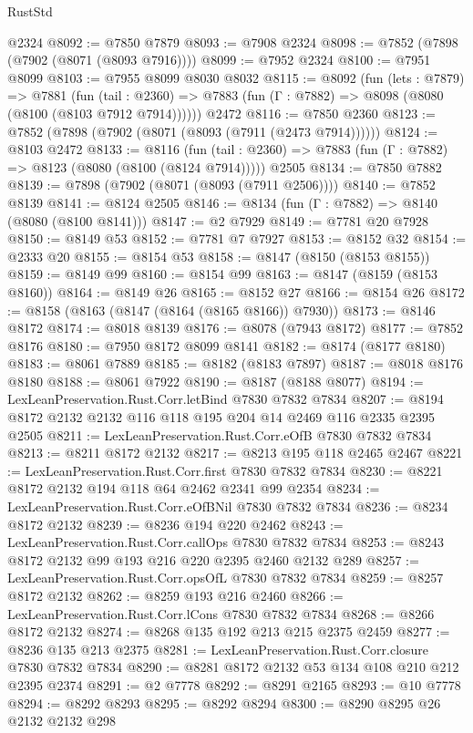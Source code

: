 \begin{lexlean}{RustStd}
\begin{coremodule}
    @2324
@8092 := @7850 @7879
@8093 := @7908 @2324
@8098 := @7852 (@7898 (@7902 (@8071 (@8093 @7916))))
@8099 := @7952 @2324
@8100 := @7951 @8099
@8103 := @7955 @8099 @8030 @8032
@8115 := @8092
    (fun (lets : @7879) =>
    @7881
      (fun (tail : @2360) => @7883 (fun (Γ : @7882) => @8098 (@8080 (@8100 (@8103 @7912 @7914))))))
    @2472
@8116 := @7850 @2360
@8123 := @7852 (@7898 (@7902 (@8071 (@8093 (@7911 (@2473 @7914))))))
@8124 := @8103 @2472
@8133 := @8116
    (fun (tail : @2360) => @7883 (fun (Γ : @7882) => @8123 (@8080 (@8100 (@8124 @7914)))))
    @2505
@8134 := @7850 @7882
@8139 := @7898 (@7902 (@8071 (@8093 (@7911 @2506))))
@8140 := @7852 @8139
@8141 := @8124 @2505
@8146 := @8134 (fun (Γ : @7882) => @8140 (@8080 (@8100 @8141)))
@8147 := @2 @7929
@8149 := @7781 @20 @7928
@8150 := @8149 @53
@8152 := @7781 @7 @7927
@8153 := @8152 @32
@8154 := @2333 @20
@8155 := @8154 @53
@8158 := @8147 (@8150 (@8153 @8155))
@8159 := @8149 @99
@8160 := @8154 @99
@8163 := @8147 (@8159 (@8153 @8160))
@8164 := @8149 @26
@8165 := @8152 @27
@8166 := @8154 @26
@8172 := @8158 (@8163 (@8147 (@8164 (@8165 @8166)) @7930))
@8173 := @8146 @8172
@8174 := @8018 @8139
@8176 := @8078 (@7943 @8172)
@8177 := @7852 @8176
@8180 := @7950 @8172 @8099 @8141
@8182 := @8174 (@8177 @8180)
@8183 := @8061 @7889
@8185 := @8182 (@8183 @7897)
@8187 := @8018 @8176 @8180
@8188 := @8061 @7922
@8190 := @8187 (@8188 @8077)
@8194 := LexLeanPreservation.Rust.Corr.letBind @7830 @7832 @7834
@8207 := @8194 @8172 @2132 @2132 @116 @118 @195 @204 @14 @2469 @116 @2335 @2395 @2505
@8211 := LexLeanPreservation.Rust.Corr.eOfB @7830 @7832 @7834
@8213 := @8211 @8172 @2132
@8217 := @8213 @195 @118 @2465 @2467
@8221 := LexLeanPreservation.Rust.Corr.first @7830 @7832 @7834
@8230 := @8221 @8172 @2132 @194 @118 @64 @2462 @2341 @99 @2354
@8234 := LexLeanPreservation.Rust.Corr.eOfBNil @7830 @7832 @7834
@8236 := @8234 @8172 @2132
@8239 := @8236 @194 @220 @2462
@8243 := LexLeanPreservation.Rust.Corr.callOps @7830 @7832 @7834
@8253 := @8243 @8172 @2132 @99 @193 @216 @220 @2395 @2460 @2132 @289
@8257 := LexLeanPreservation.Rust.Corr.opsOfL @7830 @7832 @7834
@8259 := @8257 @8172 @2132
@8262 := @8259 @193 @216 @2460
@8266 := LexLeanPreservation.Rust.Corr.lCons @7830 @7832 @7834
@8268 := @8266 @8172 @2132
@8274 := @8268 @135 @192 @213 @215 @2375 @2459
@8277 := @8236 @135 @213 @2375
@8281 := LexLeanPreservation.Rust.Corr.closure @7830 @7832 @7834
@8290 := @8281 @8172 @2132 @53 @134 @108 @210 @212 @2395 @2374
@8291 := @2 @7778
@8292 := @8291 @2165
@8293 := @10 @7778
@8294 := @8292 @8293
@8295 := @8292 @8294
@8300 := @8290 @8295 @26 @2132 @2132 @298

\end{coremodule}
\end{lexlean}
